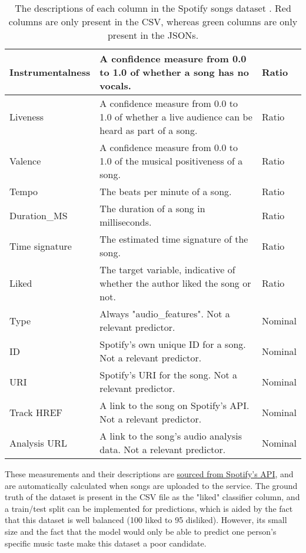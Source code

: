 \begin{table}[H]
\begin{tabular}{ |p{}| p{}| p{}|}
            \hline
            Instrumentalness & A confidence measure from 0.0 to 1.0 of whether a song has no vocals.
            & Ratio\\
            \hline
            Liveness & A confidence measure from 0.0 to 1.0 of whether a live audience can be heard as part of a song.
            & Ratio\\
            \hline
            Valence & A confidence measure from 0.0 to 1.0 of the musical positiveness of a song.
            & Ratio\\
            \hline
            Tempo & The beats per minute of a song.
            & Ratio\\
            \hline
            Duration\_MS & The duration of a song in milliseconds.
            & Ratio\\
            \hline
            Time signature & The estimated time signature of the song.
            & Ratio\\
            \hline
            \cellcolor{red!15}Liked & The target variable, indicative of whether the author liked the song or not.
            & Ratio\\
            \hline
            \cellcolor{green!15}Type & Always "audio\_features". Not a relevant predictor.
            & Nominal\\
            \hline
            \cellcolor{green!15}ID & Spotify's own unique ID for a song. Not a relevant predictor.
            & Nominal\\
            \hline
            \cellcolor{green!15}URI & Spotify's URI for the song. Not a relevant predictor.
            & Nominal\\
            \hline
            \cellcolor{green!15}Track HREF & A link to the song on Spotify's API. Not a relevant predictor.
            & Nominal\\  
            \hline
            \cellcolor{green!15}Analysis URL & A link to the song's audio analysis data. Not a relevant predictor. 
            & Nominal\\
            \hline
    \end{tabular}
    \caption{The descriptions of each column in the Spotify songs dataset \autocite{spotify_web_nodate}. Red columns are only present in the CSV, whereas green columns are only present in the JSONs.}\label{tab:Spotify-Types}
\end{table}

These measurements and their descriptions are \href{https://developer.spotify.com/documentation/web-api/reference/get-audio-features}{sourced from Spotify's API},
and are automatically calculated when songs are uploaded to the service. The ground truth of the dataset is present in the CSV file as the "liked" classifier 
column, and a train/test split can be implemented for predictions, which is aided by the fact that this dataset is well balanced (100 liked to 95 disliked).
However, its small size and the fact that the model would only be able to predict one person's specific music taste make 
this dataset a poor candidate. 


